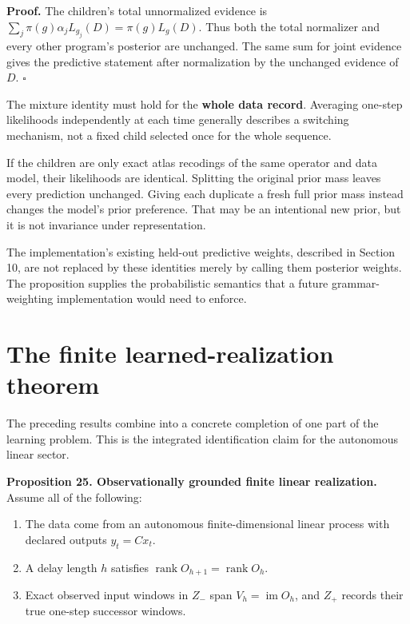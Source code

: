 \textbf{Proof.} The children's total unnormalized evidence is
\(\sum_j\pi(g)\alpha_jL_{g_j}(D)=\pi(g)L_g(D)\). Thus both the total
normalizer and every other program's posterior are unchanged. The same
sum for joint evidence gives the predictive statement after
normalization by the unchanged evidence of \(D\). \(\square\)

The mixture identity must hold for the \textbf{whole data record}.
Averaging one-step likelihoods independently at each time generally
describes a switching mechanism, not a fixed child selected once for the
whole sequence.

If the children are only exact atlas recodings of the same operator and
data model, their likelihoods are identical. Splitting the original
prior mass leaves every prediction unchanged. Giving each duplicate a
fresh full prior mass instead changes the model's prior preference. That
may be an intentional new prior, but it is not invariance under
representation.

The implementation's existing held-out predictive weights, described in
Section 10, are not replaced by these identities merely by calling them
posterior weights. The proposition supplies the probabilistic semantics
that a future grammar-weighting implementation would need to enforce.

\section{The finite learned-realization theorem}\label{LSM:the-finite-learned-realization-theorem}

The preceding results combine into a concrete completion of one part of
the learning problem. This is the integrated identification claim for
the autonomous linear sector.

\textbf{Proposition 25. Observationally grounded finite linear
realization.} Assume all of the following:

\begin{enumerate}
\def\labelenumi{\arabic{enumi}.}
\LSMtightlist
\item
  The data come from an autonomous finite-dimensional linear process
  with declared outputs \(y_t=Cx_t\).
\item
  A delay length \(h\) satisfies
  \(\operatorname{rank}O_{h+1}=\operatorname{rank}O_h\).
\item
  Exact observed input windows in \(Z_-\) span
  \(V_h=\operatorname{im}O_h\), and \(Z_+\) records their true one-step
  successor windows.
\end{enumerate}

